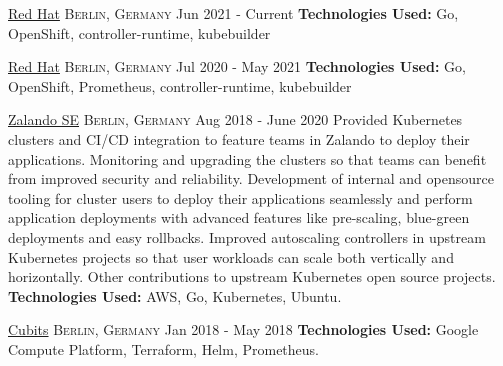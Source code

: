 \documentclass[10pt,a4paper]{article}
\begin{document}
\headedsection
{\href{https://redhat.com/}{Red Hat}}
{\textsc{Berlin, Germany}}
{
	\headedsubsection
	{}
	{Jun 2021 - Current}
	{
		\textbf{Technologies Used:} Go, OpenShift, controller-runtime, kubebuilder
	}
}

\headedsection
{\href{https://redhat.com/}{Red Hat}}
{\textsc{Berlin, Germany}}
{
	\headedsubsection
	{}
	{Jul 2020 - May 2021}
	{
		\textbf{Technologies Used:} Go, OpenShift, Prometheus, controller-runtime, kubebuilder
	}
}

\headedsection
{\href{https://zalando.de/}{Zalando SE}}
{\textsc{Berlin, Germany}}
{
	\headedsubsection
	{}
	{Aug 2018 - June 2020}
	{\bodytext
		{
			Provided Kubernetes clusters and CI/CD integration to feature teams
			in Zalando to deploy their applications. Monitoring and upgrading
			the clusters so that teams can benefit from improved security and
			reliability.  Development of internal and opensource tooling for
			cluster users to deploy their applications seamlessly and perform
			application deployments with advanced features like pre-scaling,
			blue-green deployments and easy rollbacks. Improved autoscaling
			controllers in upstream Kubernetes projects so that user workloads
			can scale both vertically and horizontally. Other contributions to
			upstream Kubernetes open source projects.
		}
		\textbf{Technologies Used:} AWS, Go, Kubernetes, Ubuntu.
	}
}

\headedsection
{\href{https://cubits.com/}{Cubits}}
{\textsc{Berlin, Germany}}
{
	\headedsubsection
	{}
	{Jan 2018 - May 2018}
	{
		\textbf{Technologies Used:} Google Compute Platform, Terraform, Helm,
		Prometheus.
	}
}
\end{document}
